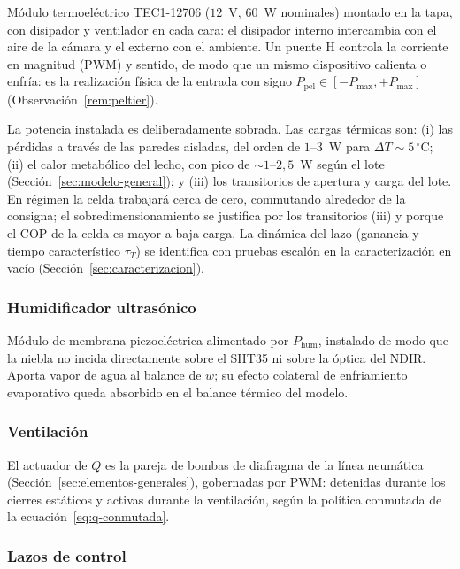 Módulo termoeléctrico TEC1-12706 ($12$~V, $60$~W nominales) montado en la
tapa, con disipador y ventilador en cada cara: el disipador interno intercambia
con el aire de la cámara y el externo con el ambiente. Un puente H controla la
corriente en magnitud (PWM) y sentido, de modo que un mismo dispositivo
calienta o enfría: es la realización física de la entrada con signo
$P_{\mathrm{pel}} \in [-P_{\max}, +P_{\max}]$
(Observación~\ref{rem:peltier}).

La potencia instalada es deliberadamente sobrada. Las cargas térmicas son:
(i) las pérdidas a través de las paredes aisladas, del orden de $1$--$3$~W
para $\Delta T \sim 5\,^\circ$C; (ii) el calor metabólico del lecho, con pico
de $\sim 1$--$2{,}5$~W según el lote (Sección~\ref{sec:modelo-general}); y
(iii) los transitorios de apertura y carga del lote. En régimen la celda
trabajará cerca de cero, commutando alrededor de la consigna; el sobredimensionamiento
se justifica por los transitorios (iii) y porque el COP de la celda es mayor a
baja carga. La dinámica del lazo (ganancia y tiempo característico
$\tau_T$) se identifica con pruebas escalón en la caracterización en vacío
(Sección~\ref{sec:caracterizacion}).

\subsubsection{Humidificador ultrasónico}

Módulo de membrana piezoeléctrica alimentado por $P_{\mathrm{hum}}$, instalado
de modo que la niebla no incida directamente sobre el SHT35 ni sobre la óptica
del NDIR. Aporta vapor de agua al balance de $w$; su efecto colateral de
enfriamiento evaporativo queda absorbido en el balance térmico del modelo.

\subsubsection{Ventilación}

El actuador de $Q$ es la pareja de bombas de diafragma de la línea neumática
(Sección~\ref{sec:elementos-generales}), gobernadas por PWM: detenidas durante
los cierres estáticos y activas durante la ventilación, según la política
conmutada de la ecuación~\eqref{eq:q-conmutada}.

\subsubsection{Lazos de control}

